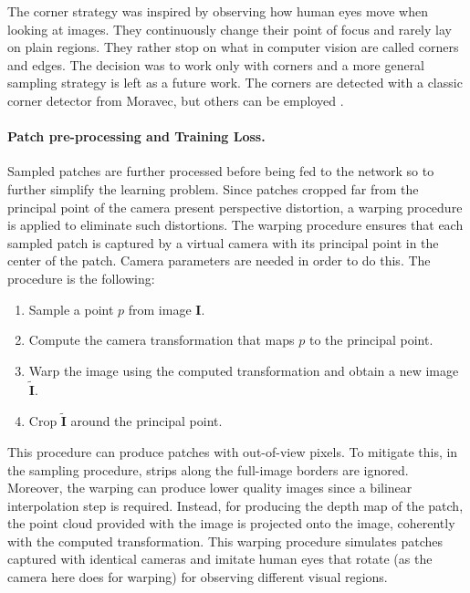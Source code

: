 The corner strategy was inspired by observing how human eyes move when looking at images.
They continuously change their point of focus and rarely lay on plain regions.
They rather stop on what in computer vision are called corners and edges.
The decision was to work only with corners and a more general sampling strategy is left as a future work.
The corners are detected with a classic corner detector from Moravec, but others can be employed \cite{computer_vision}.

\paragraph{Patch pre-processing and Training Loss.}
Sampled patches are further processed before being fed to the network so to further simplify the learning problem.
Since patches cropped far from the principal point of the camera present perspective distortion, a warping procedure is applied to eliminate such distortions.
The warping procedure ensures that each sampled patch is captured by a virtual camera with its principal point in the center of the patch.
Camera parameters are needed in order to do this.
The procedure is the following:
\begin{enumerate}
    \item{Sample a point $p$ from image $\mathbf{I}$.}
    \item{Compute the camera transformation that maps $p$ to the principal point.}
    \item{Warp the image using the computed transformation and obtain a new image $\tilde{\mathbf{I}}$.}
    \item{Crop $\tilde{\mathbf{I}}$ around the principal point.}
\end{enumerate}
This procedure can produce patches with out-of-view pixels.
To mitigate this, in the sampling procedure, strips along the full-image borders are ignored.
Moreover, the warping can produce lower quality images since a bilinear interpolation step is required.
Instead, for producing the depth map of the patch, the point cloud provided with the image is projected onto the image, coherently with the computed transformation.
This warping procedure simulates patches captured with identical cameras and imitate human eyes that rotate (as the camera here does for warping) for observing different visual regions.

